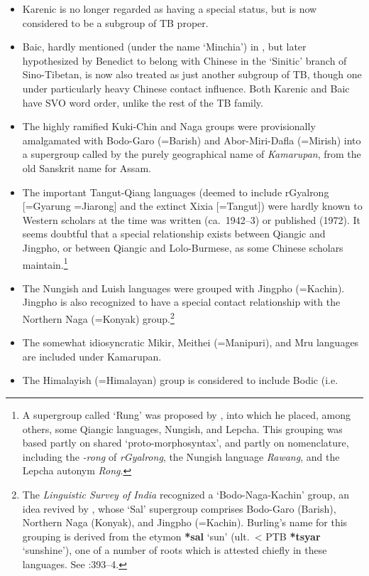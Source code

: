 \begin{itemize}
\item Karenic is no longer regarded as having a special status, but is now
considered to be a subgroup of TB proper.
\item Baic, hardly mentioned (under the name ‘Minchia’) in \textit{}, but later
hypothesized by Benedict to belong with Chinese in the ‘Sinitic’ branch of 
Sino-Tibetan, is now also treated as just another subgroup of TB, though one
under particularly heavy Chinese contact influence. Both Karenic and Baic have
SVO word order, unlike the rest of the TB family.
\item The highly ramified Kuki-Chin and Naga groups were provisionally
amalgamated with Bodo-Garo (=Barish) and Abor-Miri-Dafla (=Mirish) into a
supergroup called by the purely geographical name of \textit{Kamarupan}, from the old
Sanskrit name for Assam.
\item The important Tangut-Qiang languages (deemed to include rGyalrong
[=Gyarung =Jiarong] and the extinct Xixia [=Tangut]) were hardly known to Western
scholars at the time \textit{} was written (ca.~1942–3) or published (1972). It seems
doubtful that a special relationship exists between Qiangic and Jingpho, or
between Qiangic and Lolo-Burmese, as some Chinese scholars maintain.\footnote{A
supergroup called ‘Rung’ was proposed by \citet{GT-Rung}, into which he placed,
among others, some Qiangic languages, Nungish, and Lepcha. This grouping was
based partly on shared ‘proto-morphosyntax’, and partly on nomenclature,
including the \textit{-rong} of \textit{rGyalrong},
the Nungish language \textit{Rawang}, and the Lepcha autonym \textit{Rong}.}
\item The Nungish and Luish languages were grouped with Jingpho (=Kachin). Jingpho
is also recognized to have a special contact relationship with the Northern Naga
(=Konyak) group.\footnote{The \textit{Linguistic Survey of India}
\citep{LSI} recognized a ‘Bodo-Naga-Kachin’ group,
an idea revived by \citet{RB-Sal}, whose ‘Sal’ supergroup comprises Bodo-Garo (Barish), Northern Naga
(Konyak), and Jingpho (=Kachin). Burling’s name for this grouping is derived
from the etymon \textbf{*sal} ‘sun’ (ult.\ < PTB \textbf{*tsyar} ‘sunshine’), one of a number of
roots which is attested chiefly in these languages. See \textit{}:393–4.}
\item The somewhat idiosyncratic Mikir, Meithei (=Manipuri), and Mru languages are
included under Kamarupan.
\item The Himalayish (=Himalayan) group is considered to include Bodic (i.e.\

\end{itemize}
